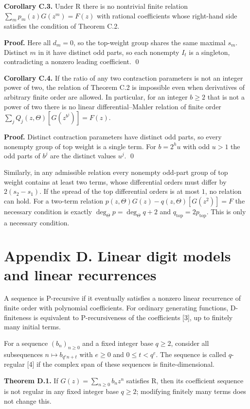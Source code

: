 \documentclass[11pt]{article}
\begin{document}
\textbf{Corollary C.3.} Under R there is no nontrivial finite relation $\sum_m p_m(z)G(z^m)=F(z)$ with rational coefficients whose right-hand side satisfies the condition of Theorem C.2.

\textbf{Proof.} Here all $d_m=0$, so the top-weight group shares the same maximal $s_m$. Distinct $m$ in it have distinct odd parts, so each nonempty $I_t$ is a singleton, contradicting a nonzero leading coefficient. \qed

\textbf{Corollary C.4.} If the ratio of any two contraction parameters is not an integer power of two, the relation of Theorem C.2 is impossible even when derivatives of arbitrary finite order are allowed. In particular, for an integer $b\ge2$ that is not a power of two there is no linear differential--Mahler relation of finite order $\sum_jQ_j(z,\Theta)[G(z^{b^j})]=F(z)$.

\textbf{Proof.} Distinct contraction parameters have distinct odd parts, so every nonempty group of top weight is a single term. For $b=2^hu$ with odd $u>1$ the odd parts of $b^j$ are the distinct values $u^j$. \qed

Similarly, in any admissible relation every nonempty odd-part group of top weight contains at least two terms, whose differential orders must differ by $2(s_2-s_1)$. If the spread of the top differential orders is at most $1$, no relation can hold. For a two-term relation $p(z,\Theta)G(z)-q(z,\Theta)[G(z^2)]=F$ the necessary condition is exactly $\deg_\Theta p=\deg_\Theta q+2$ and $q_{\mathrm{top}}=2p_{\mathrm{top}}$. This is only a necessary condition.

\section*{Appendix D. Linear digit models and linear recurrences}
A sequence is P-recursive if it eventually satisfies a nonzero linear recurrence of finite order with polynomial coefficients. For ordinary generating functions, D-finiteness is equivalent to P-recursiveness of the coefficients [3], up to finitely many initial terms.

For a sequence $(b_n)_{n\ge0}$ and a fixed integer base $q\ge2$, consider all subsequences $n\mapsto b_{q^en+t}$ with $e\ge0$ and $0\le t<q^e$. The sequence is called $q$-regular [4] if the complex span of these sequences is finite-dimensional.

\textbf{Theorem D.1.} If $G(z)=\sum_{n\ge0}b_nz^n$ satisfies R, then its coefficient sequence is not regular in any fixed integer base $q\ge2$; modifying finitely many terms does not change this.
\end{document}
